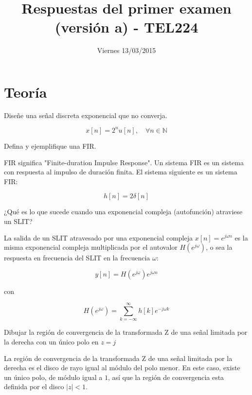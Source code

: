 \documentclass[addpoints,answers]{exam}
\begin{document}
\headrule

\title{Respuestas del primer examen (versión a) - TEL224}
\date{Viernes 13/03/2015}
\maketitle

\section*{Teoría}

\begin{questions}
\question[5]
Diseñe una señal discreta exponencial que no converja.

\begin{solution}
$$x[n] = 2^n u[n],\quad \forall n \in \mathbb{N}$$
\end{solution}

\question[5]
Defina y ejemplifique una FIR.

\begin{solution}
FIR significa "Finite-duration Impulse Response". Un sistema FIR es un sistema con respuesta al impulso de duración finita. El sistema siguiente es un sistema FIR:

$$h[n] = 2\delta[n]$$
\end{solution}

\question[5]
¿Qué es lo que sucede cuando una exponencial compleja (autofunción) atraviese un SLIT?

\begin{solution}
La salida de un SLIT atravesado por una exponencial compleja \(x[n] = e^{j\omega n}\) es la misma exponencial compleja multiplicada por el autovalor \(H\left(e^{j\omega}\right)\), o sea la respuesta en frecuencia del SLIT en la frecuencia \(\omega\):

$$
y[n] = H\left(e^{j\omega}\right) e^{j\omega n}
$$

con

$$
H\left(e^{j\omega}\right) = \sum_{k=-\infty}^{\infty} h[k] e^{-j\omega k}
$$
\end{solution}

\question[5]
Dibujar la región de convergencia de la transformada Z de una señal limitada por la derecha con un único polo en \(z=j\)

\begin{solution}
La región de convergencia de la transformada Z de una señal limitada por la derecha es el disco de rayo igual al módulo del polo menor. En este caso, existe un único polo, de módulo igual a \(1\), así que la región de convergencia esta definida por el disco \(|z| < 1\).


\end{solution}
\end{questions}
\end{document}
